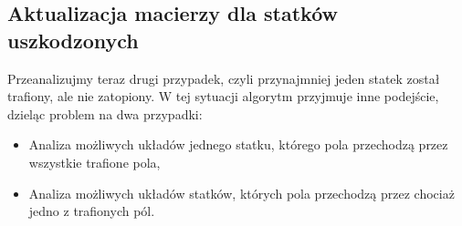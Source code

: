 \documentclass[magisterska]{pracadypl}
\begin{document}
\subsection{Aktualizacja macierzy dla statków uszkodzonych}
Przeanalizujmy teraz drugi przypadek, czyli przynajmniej jeden statek został trafiony, ale nie zatopiony. W tej sytuacji algorytm przyjmuje inne podejście, dzieląc problem na dwa przypadki:

\begin{itemize}
    \item Analiza możliwych układów jednego statku, którego pola przechodzą przez wszystkie trafione pola,

    \item Analiza możliwych układów statków, których pola przechodzą przez chociaż jedno z trafionych pól.
\end{itemize}
\end{document}
